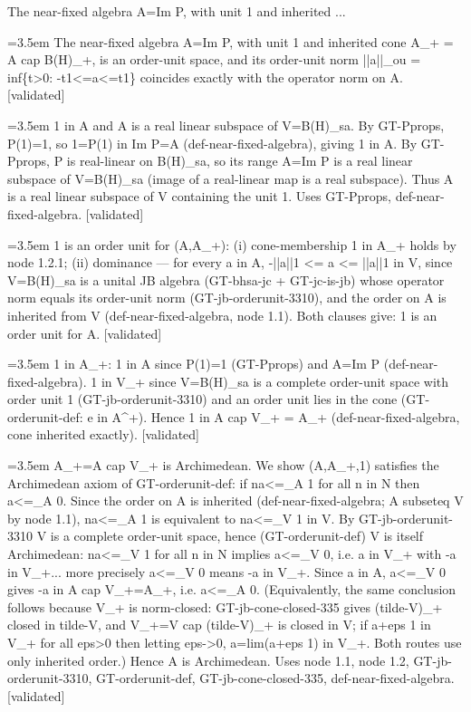 \documentclass{article}
\newcommand{\step}[1]{\par\noindent\hangindent=3.5em\hangafter=1%
  \makebox[3.5em][l]{\textbf{#1.}}}
\newcommand{\steptag}[1]{\hfill{\small\textsf{[#1]}}}
\begin{document}
\begin{proofbox}{The near-fixed algebra A=Im P, with unit 1 and inherited ...}
\step{1} The near-fixed algebra A=Im P, with unit 1 and inherited cone A\_+ = A cap B(H)\_+, is an order-unit space, and its order-unit norm ||a||\_ou = inf\{t>0: -t1<=a<=t1\} coincides exactly with the operator norm on A. \steptag{validated} \\[6pt]
\step{1.1} 1 in A and A is a real linear subspace of V=B(H)\_sa. By GT-Pprops, P(1)=1, so 1=P(1) in Im P=A (def-near-fixed-algebra), giving 1 in A. By GT-Pprops, P is real-linear on B(H)\_sa, so its range A=Im P is a real linear subspace of V=B(H)\_sa (image of a real-linear map is a real subspace). Thus A is a real linear subspace of V containing the unit 1. Uses GT-Pprops, def-near-fixed-algebra. \steptag{validated} \\[4pt]
\step{1.2} 1 is an order unit for (A,A\_+): (i) cone-membership 1 in A\_+ holds by node 1.2.1; (ii) dominance — for every a in A, -||a||1 <= a <= ||a||1 in V, since V=B(H)\_sa is a unital JB algebra (GT-bhsa-jc + GT-jc-is-jb) whose operator norm equals its order-unit norm (GT-jb-orderunit-3310), and the order on A is inherited from V (def-near-fixed-algebra, node 1.1). Both clauses give: 1 is an order unit for A. \steptag{validated} \\[6pt]
\step{1.2.1} 1 in A\_+: 1 in A since P(1)=1 (GT-Pprops) and A=Im P (def-near-fixed-algebra). 1 in V\_+ since V=B(H)\_sa is a complete order-unit space with order unit 1 (GT-jb-orderunit-3310) and an order unit lies in the cone (GT-orderunit-def: e in A\textasciicircum{}+). Hence 1 in A cap V\_+ = A\_+ (def-near-fixed-algebra, cone inherited exactly). \steptag{validated} \\[4pt]
\step{1.3} A\_+=A cap V\_+ is Archimedean. We show (A,A\_+,1) satisfies the Archimedean axiom of GT-orderunit-def: if na<=\_A 1 for all n in N then a<=\_A 0. Since the order on A is inherited (def-near-fixed-algebra; A subseteq V by node 1.1), na<=\_A 1 is equivalent to na<=\_V 1 in V. By GT-jb-orderunit-3310 V is a complete order-unit space, hence (GT-orderunit-def) V is itself Archimedean: na<=\_V 1 for all n in N implies a<=\_V 0, i.e. a in V\_+ with -a in V\_+... more precisely a<=\_V 0 means -a in V\_+. Since a in A, a<=\_V 0 gives -a in A cap V\_+=A\_+, i.e. a<=\_A 0. (Equivalently, the same conclusion follows because V\_+ is norm-closed: GT-jb-cone-closed-335 gives (tilde-V)\_+ closed in tilde-V, and V\_+=V cap (tilde-V)\_+ is closed in V; if a+eps 1 in V\_+ for all eps>0 then letting eps->0, a=lim(a+eps 1) in V\_+. Both routes use only inherited order.) Hence A is Archimedean. Uses node 1.1, node 1.2, GT-jb-orderunit-3310, GT-orderunit-def, GT-jb-cone-closed-335, def-near-fixed-algebra. \steptag{validated} \\[4pt]

\end{proofbox}
\end{document}
